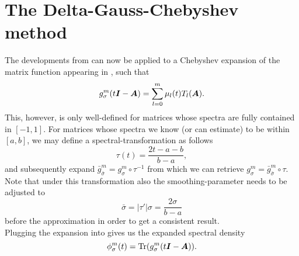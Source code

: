 
\section{The Delta-Gauss-Chebyshev method}
\label{sec:2-chebyshev-delta-gauss-chebyshev}

The developments from  can now be applied
to a Chebyshev expansion of the matrix function appearing in ,
such that
\begin{equation}
    g_{\sigma}^m(t\boldsymbol{I} - \boldsymbol{A}) = \sum_{l=0}^m \mu_l(t) T_l(\boldsymbol{A}).
    \label{equ:2-chebyshev-chebyshev-expansion}
\end{equation}
This, however, is only well-defined for matrices whose spectra are fully
contained in $[-1, 1]$. For matrices whose spectra we know (or can estimate) to
be within $[a, b]$, we may define a \gls{spectral-transformation} as follows
\begin{equation}
    \tau(t) = \frac{2t - a - b}{b - a},
    \label{equ:2-chebyshev-spectral-transformation}
\end{equation}
and subsequently expand $\bar{g}_{\bar{\sigma}}^m = g_{\sigma}^m \circ \tau^{-1}$ 
from which we can retrieve $g_{\sigma}^m = \bar{g}_{\bar{\sigma}}^m \circ \tau$.
Note that under this transformation also the \gls{smoothing-parameter} needs to be
adjusted to
\begin{equation}
    \bar{\sigma} = |\tau'| \sigma = \frac{2\sigma}{b - a}
    \label{equ:2-chebyshev-sigma-transformation}
\end{equation}
before the approximation in order to get a consistent result.\\

Plugging the expansion  into 
 gives us the expanded
spectral density
\begin{equation}
    \phi_{\sigma}^m(t) = \operatorname{Tr}(g_{\sigma}^m(t\boldsymbol{I} - \boldsymbol{A})).
    \label{equ:2-chebyshev-spectral-density-as-trace-expansion}
\end{equation}

